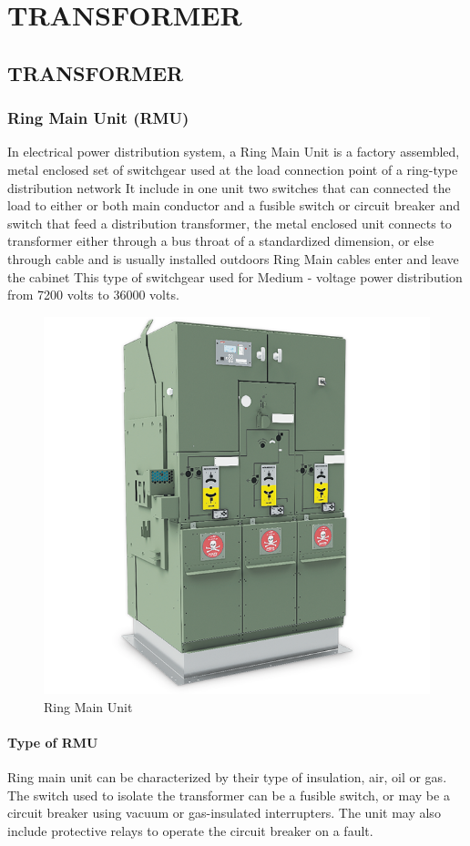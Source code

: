 \documentclass[12pt,fleqn]{book} %
\begin{document}
\part {TRANSFORMER}

\chapter{TRANSFORMER}



\justify 
\section {Ring Main Unit (RMU)}
In electrical power distribution system, a Ring Main Unit is a factory assembled, metal enclosed set of switchgear used at the load connection point of a ring-type distribution network It include in one unit two switches that can connected the load to either or both main conductor and a fusible switch or circuit breaker and switch that feed a distribution transformer, the metal enclosed unit connects to transformer either through a bus throat of a standardized dimension, or else through cable and is usually installed outdoors Ring Main cables enter and leave the cabinet This type of switchgear used for Medium - voltage power distribution from 7200 volts to 36000 volts.
\begin{figure}[h!]
    \centering
    \includegraphics[width=0.5\linewidth]{hamdy 1.png}
    \caption{Ring Main Unit}
    \label{fig:hamdy 1}
\end{figure}
\subsection {Type of RMU}
Ring main unit can be characterized by their type of insulation, air, oil or gas. The switch used to isolate the transformer can be a fusible switch, or may be a circuit breaker using vacuum or gas-insulated interrupters. The unit may also include protective relays to operate the circuit
breaker on a fault.
\newpage
\end{document}
